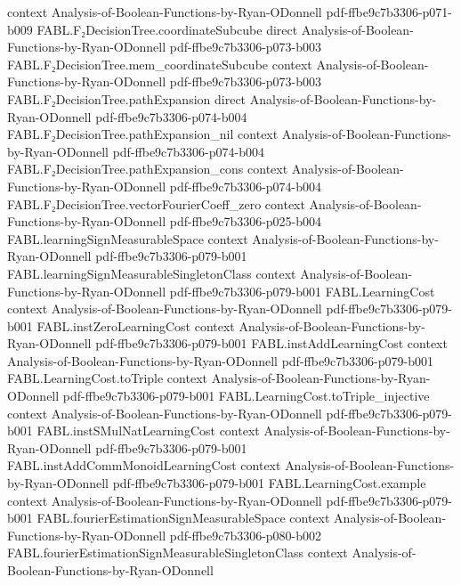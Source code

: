 \begin{theorem}
  {context}
  {Analysis-of-Boolean-Functions-by-Ryan-ODonnell}
  {pdf-ffbe9c7b3306-p071-b009}
\proofstep
  {FABL.F₂DecisionTree.coordinateSubcube}
  {direct}
  {Analysis-of-Boolean-Functions-by-Ryan-ODonnell}
  {pdf-ffbe9c7b3306-p073-b003}
\proofstep
  {FABL.F₂DecisionTree.mem_coordinateSubcube}
  {context}
  {Analysis-of-Boolean-Functions-by-Ryan-ODonnell}
  {pdf-ffbe9c7b3306-p073-b003}
\proofstep
  {FABL.F₂DecisionTree.pathExpansion}
  {direct}
  {Analysis-of-Boolean-Functions-by-Ryan-ODonnell}
  {pdf-ffbe9c7b3306-p074-b004}
\proofstep
  {FABL.F₂DecisionTree.pathExpansion_nil}
  {context}
  {Analysis-of-Boolean-Functions-by-Ryan-ODonnell}
  {pdf-ffbe9c7b3306-p074-b004}
\proofstep
  {FABL.F₂DecisionTree.pathExpansion_cons}
  {context}
  {Analysis-of-Boolean-Functions-by-Ryan-ODonnell}
  {pdf-ffbe9c7b3306-p074-b004}
\proofstep
  {FABL.F₂DecisionTree.vectorFourierCoeff_zero}
  {context}
  {Analysis-of-Boolean-Functions-by-Ryan-ODonnell}
  {pdf-ffbe9c7b3306-p025-b004}
\proofstep
  {FABL.learningSignMeasurableSpace}
  {context}
  {Analysis-of-Boolean-Functions-by-Ryan-ODonnell}
  {pdf-ffbe9c7b3306-p079-b001}
\proofstep
  {FABL.learningSignMeasurableSingletonClass}
  {context}
  {Analysis-of-Boolean-Functions-by-Ryan-ODonnell}
  {pdf-ffbe9c7b3306-p079-b001}
\proofstep
  {FABL.LearningCost}
  {context}
  {Analysis-of-Boolean-Functions-by-Ryan-ODonnell}
  {pdf-ffbe9c7b3306-p079-b001}
\proofstep
  {FABL.instZeroLearningCost}
  {context}
  {Analysis-of-Boolean-Functions-by-Ryan-ODonnell}
  {pdf-ffbe9c7b3306-p079-b001}
\proofstep
  {FABL.instAddLearningCost}
  {context}
  {Analysis-of-Boolean-Functions-by-Ryan-ODonnell}
  {pdf-ffbe9c7b3306-p079-b001}
\proofstep
  {FABL.LearningCost.toTriple}
  {context}
  {Analysis-of-Boolean-Functions-by-Ryan-ODonnell}
  {pdf-ffbe9c7b3306-p079-b001}
\proofstep
  {FABL.LearningCost.toTriple_injective}
  {context}
  {Analysis-of-Boolean-Functions-by-Ryan-ODonnell}
  {pdf-ffbe9c7b3306-p079-b001}
\proofstep
  {FABL.instSMulNatLearningCost}
  {context}
  {Analysis-of-Boolean-Functions-by-Ryan-ODonnell}
  {pdf-ffbe9c7b3306-p079-b001}
\proofstep
  {FABL.instAddCommMonoidLearningCost}
  {context}
  {Analysis-of-Boolean-Functions-by-Ryan-ODonnell}
  {pdf-ffbe9c7b3306-p079-b001}
\proofstep
  {FABL.LearningCost.example}
  {context}
  {Analysis-of-Boolean-Functions-by-Ryan-ODonnell}
  {pdf-ffbe9c7b3306-p079-b001}
\proofstep
  {FABL.fourierEstimationSignMeasurableSpace}
  {context}
  {Analysis-of-Boolean-Functions-by-Ryan-ODonnell}
  {pdf-ffbe9c7b3306-p080-b002}
\proofstep
  {FABL.fourierEstimationSignMeasurableSingletonClass}
  {context}
  {Analysis-of-Boolean-Functions-by-Ryan-ODonnell}

\end{theorem}
